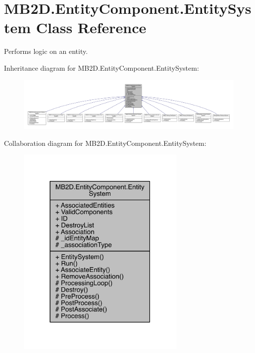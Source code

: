 \hypertarget{class_m_b2_d_1_1_entity_component_1_1_entity_system}{}\section{M\+B2\+D.\+Entity\+Component.\+Entity\+System Class Reference}
\label{class_m_b2_d_1_1_entity_component_1_1_entity_system}


Performs logic on an entity.  




Inheritance diagram for M\+B2\+D.\+Entity\+Component.\+Entity\+System\+:
\nopagebreak
\begin{figure}[H]
\begin{center}
\leavevmode
\includegraphics[width=350pt]{class_m_b2_d_1_1_entity_component_1_1_entity_system__inherit__graph}
\end{center}
\end{figure}


Collaboration diagram for M\+B2\+D.\+Entity\+Component.\+Entity\+System\+:
\nopagebreak
\begin{figure}[H]
\begin{center}
\leavevmode
\includegraphics[width=231pt]{class_m_b2_d_1_1_entity_component_1_1_entity_system__coll__graph}
\end{center}
\end{figure}
